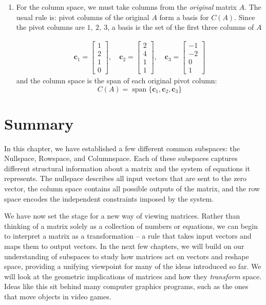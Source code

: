 \begin{Answer}[ref={ex:bigprob}]
\begin{enumerate}[label=\alph*]
These three rows are linearly independent, and they span the row space because row reduction did not create any new row space, just simplified the set. So $\dim \text{Row}(A) = 3$. 

\item For the column space, we must take columns from the \emph{original} matrix $A$. The usual rule is: pivot columns of the original $A$ form a basis for $C(A)$. Since the pivot columns are $1,\ 2,\ 3$, a basis is the set of the first three columns of $A$ 

$$\begin{array}{c} \mathbf{c}_1=\begin{bmatrix}1\\2\\1\\0\end{bmatrix},\quad
\mathbf{c}_2=\begin{bmatrix}2\\4\\1\\1\end{bmatrix},\quad
\mathbf{c}_3=\begin{bmatrix}-1\\-2\\0\\1\end{bmatrix} \end{array}$$
and the column space is the span of each original pivot column:
$$C(A)=\operatorname{span}\{\mathbf{c}_1,\mathbf{c}_2,\mathbf{c}_3\}$$
\end{enumerate}

\end{Answer}


\section{Summary}
In this chapter, we have established a few different common subspaces: the Nullspace, Rowspace, and Columnspace. Each of these subspaces captures different structural information about a matrix and the system of equations it represents. The nullspace describes all input vectors that are sent to the zero vector, the column space contains all possible outputs of the matrix, and the row space encodes the independent constraints imposed by the system.

We have now set the stage for a new way of viewing matrices. Rather than thinking of a matrix solely as a collection of numbers or equations, we can begin to interpret a matrix as a transformation -- a rule that takes input vectors and maps them to output vectors. In the next few chapters, we will build on our understanding of subspaces to study how matrices act on vectors and reshape space, providing a unifying viewpoint for many of the ideas introduced so far. We will look at the geometric implications of matrices and how they \textit{transform} space. Ideas like this sit behind many computer graphics programs, such as the ones that move objects in video games.

